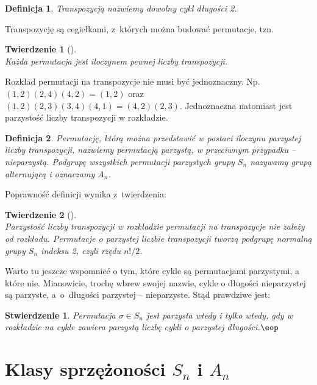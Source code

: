 \documentclass[licencjacka]{pracamgr}
\newtheorem{deff}{Definicja}[section]
\newtheorem{thh}{Twierdzenie}[section]
\newtheorem{fact}{Stwierdzenie}[section]
\begin{document}
\begin{deff}
    \emph{Transpozycją} nazwiemy dowolny cykl długości 2.
\end{deff}

Transpozycję są cegiełkami, z~których można budować permutacje, tzn.

\begin{thh}[{\cite[stw. 3.7.]{Baginski}}] $ $\\
    Każda permutacja jest iloczynem pewnej liczby transpozycji.
\end{thh}

Rozkład permutacji na transpozycje nie musi być jednoznaczny. Np.
$(1, 2) (2, 4) (4, 2) = (1, 2)$ oraz $(1, 2) (2, 3) (3, 4) (4, 1) =
(4, 2) (2, 3)$. Jednoznaczna natomiast jest parzystość liczby
transpozycji w rozkładzie.

\begin{deff}
    Permutację, którą można przedstawić w postaci iloczynu parzystej liczby
    transpozycji, nazwiemy \emph{permutacją parzystą},
    w przeciwnym przypadku -- \emph{nieparzystą}.
    Podgrupę wszystkich permutacji parzystych grupy $S_n$ nazywamy \emph{grupą alternującą} i oznaczamy $A_n$.
\end{deff}


Poprawność definicji wynika z~twierdzenia:

\begin{thh}[{\cite[stw. 3.8.]{Baginski}}]\label{thm_A_n} $ $ \\
    Parzystość liczby transpozycji w rozkładzie permutacji na transpozycje nie zależy od rozkładu.
    Permutacje o parzystej liczbie transpozycji tworzą podgrupę normalną grupy $S_n$ indeksu 2, czyli
    rzędu $n!/2$.
\end{thh}

Warto tu jeszcze wspomnieć o tym, które cykle są permutacjami
parzystymi, a które nie. Mianowicie, trochę wbrew swojej nazwie,
cykle o długości nieparzystej są parzyste, a~o~długości parzystej --
nieparzyste. Stąd prawdziwe jest:

\begin{fact}\label{fact_typ_A_n}
    Permutacja $\sigma \in S_n$ jest parzysta wtedy i tylko wtedy, gdy w rozkładzie na cykle
    zawiera parzystą liczbę cykli o parzystej długości.\quad$\eop$
\end{fact}


\section{Klasy sprzężoności $S_n$ i $A_n$}
\end{document}
